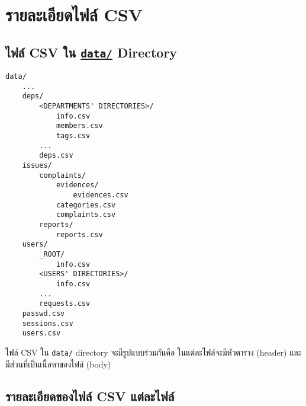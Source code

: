 \section{รายละเอียดไฟล์ CSV}

\subsection{ไฟล์ CSV ใน \href{https://github.com/CS211-651/project211-oakcoding/tree/9397d355461933fb007261e2ee97445ea93eacc1/data}{\texttt{data\slash}} Directory}

\begin{lstlisting}[name={ไฟล์ CSV ใน data/ Directory},numbers=none]
data/
    ...
    deps/
        <DEPARTMENTS' DIRECTORIES>/
            info.csv
            members.csv
            tags.csv
        ...
        deps.csv
    issues/
        complaints/
            evidences/
                evidences.csv
            categories.csv
            complaints.csv
        reports/
            reports.csv
    users/
        _ROOT/
            info.csv
        <USERS' DIRECTORIES>/
            info.csv
        ...
        requests.csv
    passwd.csv
    sessions.csv
    users.csv
\end{lstlisting}

\clearpage

ไฟล์ CSV ใน \texttt{data/} directory จะมีรูปแบบร่วมกันคือ
ในแต่ละไฟล์จะมีหัวตาราง (header) และมีส่วนที่เป็นเนื้อหาของไฟล์ (body)


\subsection{รายละเอียดของไฟล์ CSV แต่ละไฟล์}
\noindent\blindtext[3]
